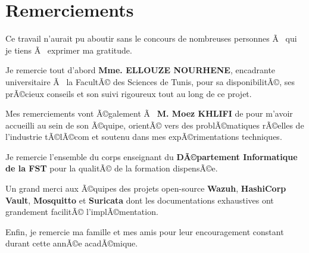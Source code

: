 \chapter*{Remerciements}

Ce travail n'aurait pu aboutir sans le concours de nombreuses personnes Ã  qui je tiens Ã  exprimer ma gratitude.

Je remercie tout d'abord \textbf{Mme. ELLOUZE NOURHENE}, encadrante universitaire Ã  la FacultÃ© des Sciences de Tunis, pour sa disponibilitÃ©, ses prÃ©cieux conseils et son suivi rigoureux tout au long de ce projet.

Mes remerciements vont Ã©galement Ã  \textbf{M. Moez KHLIFI} de \TT{} pour m'avoir accueilli au sein de son Ã©quipe, orientÃ© vers des problÃ©matiques rÃ©elles de l'industrie tÃ©lÃ©com et soutenu dans mes expÃ©rimentations techniques.

Je remercie l'ensemble du corps enseignant du \textbf{DÃ©partement Informatique de la FST} pour la qualitÃ© de la formation dispensÃ©e.

Un grand merci aux Ã©quipes des projets open-source \textbf{Wazuh}, \textbf{HashiCorp Vault}, \textbf{Mosquitto} et \textbf{Suricata} dont les documentations exhaustives ont grandement facilitÃ© l'implÃ©mentation.

Enfin, je remercie ma famille et mes amis pour leur encouragement constant durant cette annÃ©e acadÃ©mique.

\cleardoublepage
